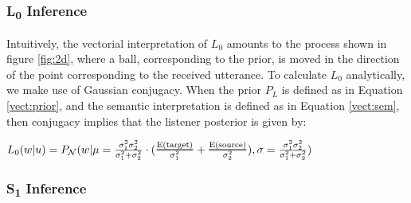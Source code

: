 \documentclass[OpenMind]{stjour}
\begin{document}
\subsubsection{L\textsubscript{0} Inference}


	Intuitively, the vectorial interpretation of $L_0$ amounts to the process shown in figure \ref{fig:2d}, where a ball, corresponding to the prior, is moved in the direction of the point corresponding to the received utterance. To calculate $L_0$ analytically, we make use of Gaussian conjugacy. When the prior $P_L$ is defined as in Equation \ref{vect:prior}, and the semantic interpretation is defined as in Equation \ref{vect:sem}, then conjugacy implies that the listener posterior is given by:


	$L_0(w|u) = P_{\mathcal{N}}(w\vert\mu=\frac{\sigma_1^2 \sigma_2^2}{\sigma_1^2+\sigma_2^2}\cdot(\frac{{\textrm{\emph{E(target)}}}}{\sigma_1^2}+\frac{{\textrm{\emph{E(source)}}}}{\sigma_2^2}), \sigma=\frac{\sigma_1^2 \sigma_2^2}{\sigma_1^2+\sigma_2^2})$

















\subsubsection{S\textsubscript{1} Inference}
\end{document}
